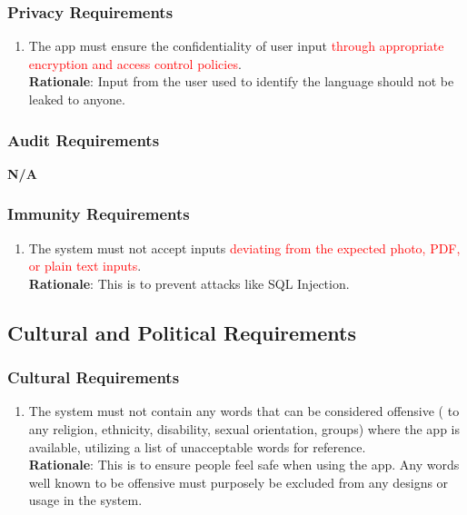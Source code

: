 \subsubsection{Privacy Requirements}
\label{ssub:privacy_requirements}
\begin{enumerate}[{SR-P}1. ]
	\item The app must ensure the confidentiality of user input \textcolor{red}{through appropriate encryption and access control policies}. 
	\\ \textbf{Rationale}: Input from the user used to identify the language should not be leaked to anyone.
\end{enumerate}

\subsubsection{Audit Requirements}
\label{ssub:audit_requirements}
\textbf{N/A}

\subsubsection{Immunity Requirements}
\label{ssub:immunity_requirements}
\begin{enumerate}[{SR-IM}1. ]
	\item The system must not accept inputs \textcolor{red}{deviating from the expected photo, PDF, or plain text inputs}.
	\\ \textbf{Rationale}: This is to prevent attacks like SQL Injection.
\end{enumerate}


\subsection{Cultural and Political Requirements}
\label{sub:cultural_and_political_requirements}

\subsubsection{Cultural Requirements}
\label{ssub:cultural_requirements}
\begin{enumerate}[{CP-C}1. ]
	\item The system must not contain any words that can be considered offensive ( to any religion, ethnicity, disability, sexual orientation, groups) where the app is available, utilizing a list of unacceptable words for reference.
	\\ \textbf{Rationale}: This is to ensure people feel safe when using the app.  Any words well known to be offensive must purposely be 	excluded from any designs or usage in the system. 
\end{enumerate}

